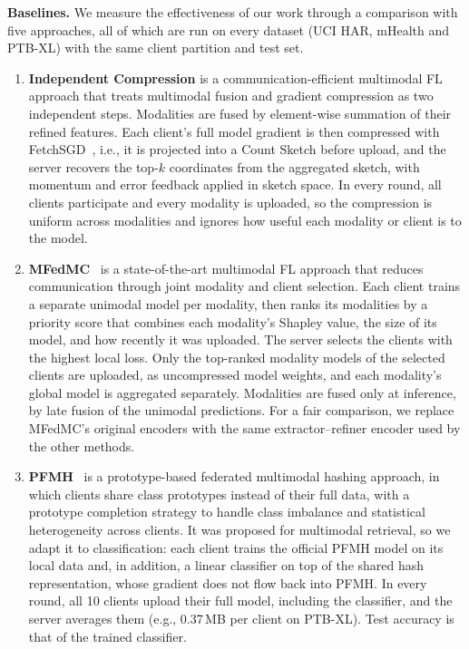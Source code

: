 \documentclass[sigconf]{acmart}
\begin{document}
\textbf{Baselines.}
We measure the effectiveness of our work through a comparison with five approaches, all of which are run on every dataset (UCI HAR, mHealth and PTB-XL) with the same client partition and test set.
\begin{enumerate}
  \item \textbf{Independent Compression}
  is a communication-efficient multimodal FL approach that treats multimodal fusion and gradient compression as two independent steps. Modalities are fused by element-wise summation of their refined features. Each client's full model gradient is then compressed with FetchSGD~\cite{rothchild2020fetchsgd}, i.e., it is projected into a Count Sketch before upload, and the server recovers the top-$k$ coordinates from the aggregated sketch, with momentum and error feedback applied in sketch space. In every round, all clients participate and every modality is uploaded, so the compression is uniform across modalities and ignores how useful each modality or client is to the model.

  \item \textbf{MFedMC}~\cite{yuan2024mfedmc}
  is a state-of-the-art multimodal FL approach that reduces communication through joint modality and client selection. Each client trains a separate unimodal model per modality, then ranks its modalities by a priority score that combines each modality's Shapley value, the size of its model, and how recently it was uploaded. The server selects the clients with the highest local loss. Only the top-ranked modality models of the selected clients are uploaded, as uncompressed model weights, and each modality's global model is aggregated separately. Modalities are fused only at inference, by late fusion of the unimodal predictions. For a fair comparison, we replace MFedMC's original encoders with the same extractor--refiner encoder used by the other methods.

    \item \textbf{PFMH}~\cite{zuo2025pfmh}
  is a prototype-based federated multimodal hashing approach, in which clients
  share class prototypes instead of their full data, with a prototype
  completion strategy to handle class imbalance and statistical heterogeneity
  across clients. It was proposed for multimodal retrieval, so we adapt it to
  classification: each client trains the official PFMH model on its local data
  and, in addition, a linear classifier on top of the shared hash
  representation, whose gradient does not flow back into PFMH. In every round,
  all 10 clients upload their full model, including the classifier, and the
  server averages them (e.g., 0.37\,MB per client on PTB-XL). Test accuracy is
  that of the trained classifier.


\end{enumerate}
\end{document}
